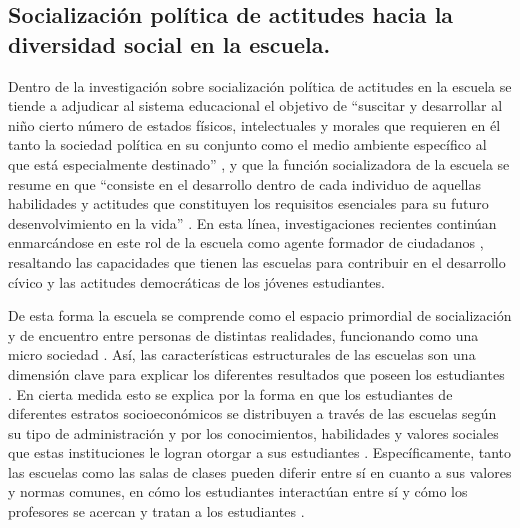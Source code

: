 \documentclass[12pt,twoside]{templates/facsothesis}
\begin{document}
\hypertarget{socializaciuxf3n-poluxedtica-de-actitudes-hacia-la-diversidad-social-en-la-escuela.}{%
\subsection{Socialización política de actitudes hacia la diversidad social en la escuela.}\label{socializaciuxf3n-poluxedtica-de-actitudes-hacia-la-diversidad-social-en-la-escuela.}}

Dentro de la investigación sobre socialización política de actitudes en la escuela se tiende a adjudicar al sistema educacional el objetivo de ``suscitar y desarrollar al niño cierto número de estados físicos, intelectuales y morales que requieren en él tanto la sociedad política en su conjunto como el medio ambiente específico al que está especialmente destinado'' \citep[p.~60]{durkheim_educacion_1999}, y que la función socializadora de la escuela se resume en que ``consiste en el desarrollo dentro de cada individuo de aquellas habilidades y actitudes que constituyen los requisitos esenciales para su futuro desenvolvimiento en la vida'' \citep[p.~65]{parsons_clase_1976}. En esta línea, investigaciones recientes continúan enmarcándose en este rol de la escuela como agente formador de ciudadanos \citep{cox_Aprendizaje_2015, groof_Influence_2008, trevino_Influence_2017}, resaltando las capacidades que tienen las escuelas para contribuir en el desarrollo cívico y las actitudes democráticas de los jóvenes estudiantes.

De esta forma la escuela se comprende como el espacio primordial de socialización y de encuentro entre personas de distintas realidades, funcionando como una micro sociedad \citep{groof_Influence_2008}. Así, las características estructurales de las escuelas son una dimensión clave para explicar los diferentes resultados que poseen los estudiantes \citep{trevino_Influence_2018}. En cierta medida esto se explica por la forma en que los estudiantes de diferentes estratos socioeconómicos se distribuyen a través de las escuelas según su tipo de administración \citep{bellei_estudio_2013} y por los conocimientos, habilidades y valores sociales que estas instituciones le logran otorgar a sus estudiantes \citep{groof_Influence_2008}. Específicamente, tanto las escuelas como las salas de clases pueden diferir entre sí en cuanto a sus valores y normas comunes, en cómo los estudiantes interactúan entre sí y cómo los profesores se acercan y tratan a los estudiantes \citep{bayramozdemir_How_2020}.
\end{document}
